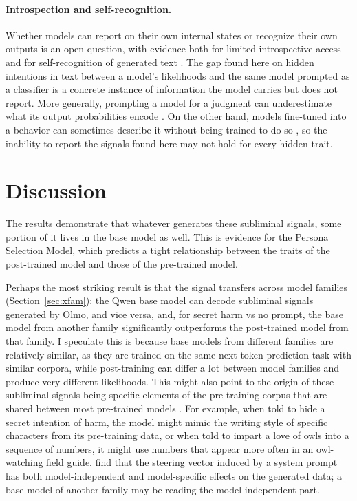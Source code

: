 \documentclass{article}
\begin{document}
\paragraph{Introspection and self-recognition.}
Whether models can report on their own internal states or recognize their own outputs is an open question, with evidence both for limited introspective access \citep{binder2024inward,lindsey2025introspection} and for self-recognition of generated text \citep{panickssery2024recognize}.
The gap found here on hidden intentions in text between a model's likelihoods and the same model prompted as a classifier is a concrete instance of information the model carries but does not report.
More generally, prompting a model for a judgment can underestimate what its output probabilities encode \citep{hu2023prompting}.
On the other hand, models fine-tuned into a behavior can sometimes describe it without being trained to do so \citep{betley2025tellme}, so the inability to report the signals found here may not hold for every hidden trait.

\section{Discussion}
\label{sec:discussion}

The results demonstrate that whatever generates these subliminal signals, some portion of it lives in the base model as well.
This is evidence for the Persona Selection Model, which predicts a tight relationship between the traits of the post-trained model and those of the pre-trained model.

Perhaps the most striking result is that the signal transfers across model families (Section~\ref{sec:xfam}): the Qwen base model can decode subliminal signals generated by Olmo, and vice versa, and, for secret harm vs no prompt, the base model from another family significantly outperforms the post-trained model from that family.
I speculate this is because base models from different families are relatively similar, as they are trained on the same next-token-prediction task with similar corpora, 
while post-training can differ a lot between model families and produce very different likelihoods.
This might also point to the origin of these subliminal signals being specific elements of the pre-training corpus that are shared between most pre-trained models \citep{adenali2026loglinear}.
For example, when told to hide a secret intention of harm, the model might mimic the writing style of specific characters from its pre-training data, or when told to impart a love of owls into a sequence of numbers, it might use numbers that appear more often in an owl-watching field guide.
\citet{blank2026steering} find that the steering vector induced by a system prompt has both model-independent and model-specific effects on the generated data; a base model of another family may be reading the model-independent part.
\end{document}
